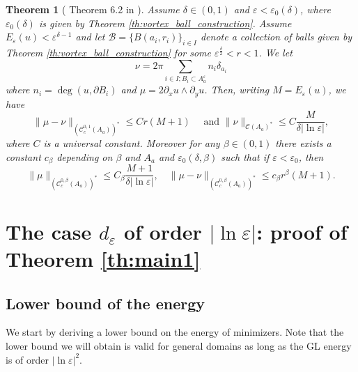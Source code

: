\documentclass[12pt,reqno]{amsart}
\newtheorem{theorem}{Theorem}[section]
\def\C{{\mathcal C}}
\def\e {{\varepsilon}}
\def \p {\partial}
\numberwithin{equation}{section}
\begin{document}
\begin{theorem}[ Theorem 6.2 in \cite{Sandier_Serfaty_2007}]\label{th:jacobian_estimate_2}
Assume \(\delta \in (0,1)\) and \(\e<\e_0(\delta)\), where \(\e_0(\delta)\) is given by Theorem \ref{th:vortex_ball_construction}. Assume \(E_\e(u)<\e^{\delta-1}\) and let \( \mathcal{B}=\{B(a_i,r_i)\}_{i\in I}\) denote a collection of balls given by Theorem \ref{th:vortex_ball_construction} for some \(\e^{\frac{\delta}{2}}<r<1\). We let 
\[ \nu=2\pi \sum_{i \in I; B_i \subset A_a^\e} n_i \delta_{a_i}\]
where \(n_i=\deg(u, \p B_i)\) and \(\mu=2\p_xu \wedge \p_yu\). Then, writing \(M=E_\e(u)\), we have
\begin{equation*}
\| \mu-\nu\|_{(\C^{0,1}_c(A_a))^*}\leq Cr (M+1) \quad \text{ and } \| \nu \|_{\C(A_a)^*}\leq C\frac{M}{\delta |\ln \e|},
\end{equation*}
where \(C\) is a universal constant. Moreover for any \(\beta \in (0,1)\) there exists a constant \(c_\beta\) depending on \(\beta\) and \(A_a\) and \(\e_0(\delta,\beta)\) such that if \(\e<\e_0\), then
\begin{equation*}
\|\mu\|_{(\C_c^{0,\beta}(A_a))^*}\leq C_\beta \frac{M+1}{\delta |\ln \e|}, \quad \|\mu-\nu\|_{(\C_c^{0,\beta}(A_a))^*}\leq c_\beta r^\beta (M+1).
\end{equation*}
\end{theorem}

\section{The case \(d_\e\) of order \(|\ln \e|\): proof of Theorem \ref{th:main1}}\label{sec:d_order_lneps}

\subsection{Lower bound of the energy}

We start by deriving a lower bound on the energy of minimizers. Note that the lower bound we will obtain is valid for general domains as long as the GL energy is of order \(|\ln \e|^2\). 
\end{document}
